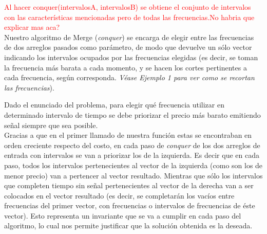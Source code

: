 \textcolor{red}{Al hacer conquer(intervalosA, intervalosB) se obtiene el conjunto de intervalos con las caracter\'isticas mencionadas pero de todas las frecuencias.}\textcolor{red}{No habria que explicar mas aca?}\\

Nuestro algoritmo de Merge (\emph{conquer}) se encarga de elegir entre las frecuencias de dos arreglos pasados como parámetro, de modo que devuelve un sólo vector indicando los intervalos ocupados por las frecuencias elegidas (es decir, se toman la frecuencia más barata a cada momento, y se hacen los cortes pertinentes a cada frecuencia, según corresponda. \emph{Véase Ejemplo 1 para ver como se recortan las frecuencias}). 

Dado el enunciado del problema, para elegir qu\'e frecuencia utilizar en determinado intervalo de tiempo se debe priorizar el precio m\'as barato emitiendo se\~nal siempre que sea posible.\\

Gracias a que en el primer llamado de nuestra funci\'on estas se encontraban en orden creciente respecto del costo, en cada paso de \emph{conquer} de los dos arreglos de entrada con intervalos se van a priorizar los de la izquierda. Es decir que en cada paso, todos los intervalos pertenecientes al vector de la izquierda (como son los de menor precio) van a pertencer al vector resultado. Mientras que s\'olo los intervalos que completen tiempo sin se\~nal pertenecientes al vector de la derecha van a ser colocados en el vector resultado (es decir, se completarán los vacíos entre frecuencias del primer vector, con frecuencias o intervalos de frecuencias de \'este vector). Esto representa un invariante que se va a cumplir en cada paso del algoritmo, lo cual nos permite justificar que la soluci\'on obtenida es la deseada.\\

